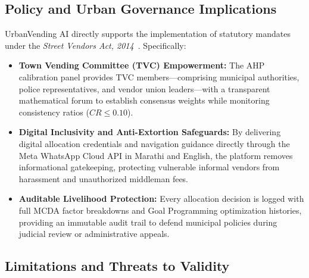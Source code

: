 \subsection{Policy and Urban Governance Implications}
\label{sec:disc_policy}

UrbanVending AI directly supports the implementation of statutory mandates under the \textit{Street Vendors Act, 2014}~\cite{india2014street}. Specifically:
\begin{itemize}
    \item \textbf{Town Vending Committee (TVC) Empowerment:} The AHP calibration panel provides TVC members—comprising municipal authorities, police representatives, and vendor union leaders—with a transparent mathematical forum to establish consensus weights while monitoring consistency ratios ($CR \le 0.10$).
    \item \textbf{Digital Inclusivity and Anti-Extortion Safeguards:} By delivering digital allocation credentials and navigation guidance directly through the Meta WhatsApp Cloud API in Marathi and English, the platform removes informational gatekeeping, protecting vulnerable informal vendors from harassment and unauthorized middleman fees.
    \item \textbf{Auditable Livelihood Protection:} Every allocation decision is logged with full MCDA factor breakdowns and Goal Programming optimization histories, providing an immutable audit trail to defend municipal policies during judicial review or administrative appeals.
\end{itemize}

\subsection{Limitations and Threats to Validity}
\label{sec:disc_limitations}

